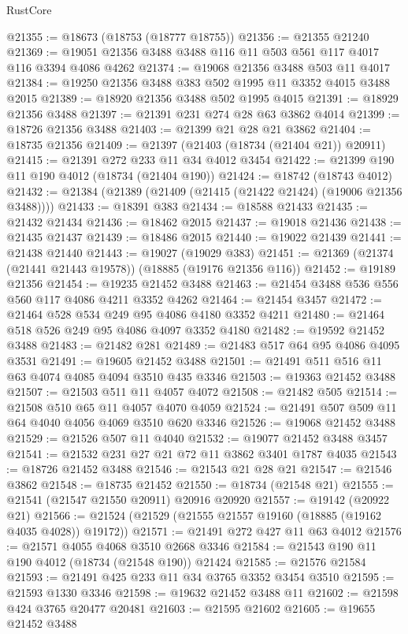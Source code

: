 \begin{lexlean}{RustCore}
\begin{coremodule}
@21355 := @18673 (@18753 (@18777 @18755))
@21356 := @21355 @21240
@21369 := @19051 @21356 @3488 @3488 @116 @11 @503 @561 @117 @4017 @116 @3394 @4086 @4262
@21374 := @19068 @21356 @3488 @503 @11 @4017
@21384 := @19250 @21356 @3488 @383 @502 @1995 @11 @3352 @4015 @3488 @2015
@21389 := @18920 @21356 @3488 @502 @1995 @4015
@21391 := @18929 @21356 @3488
@21397 := @21391 @231 @274 @28 @63 @3862 @4014
@21399 := @18726 @21356 @3488
@21403 := @21399 @21 @28 @21 @3862
@21404 := @18735 @21356
@21409 := @21397 (@21403 (@18734 (@21404 @21)) @20911)
@21415 := @21391 @272 @233 @11 @34 @4012 @3454
@21422 := @21399 @190 @11 @190 @4012 (@18734 (@21404 @190))
@21424 := @18742 (@18743 @4012)
@21432 := @21384 (@21389 (@21409 (@21415 (@21422 @21424) (@19006 @21356 @3488))))
@21433 := @18391 @383
@21434 := @18588 @21433
@21435 := @21432 @21434
@21436 := @18462 @2015
@21437 := @19018 @21436
@21438 := @21435 @21437
@21439 := @18486 @2015
@21440 := @19022 @21439
@21441 := @21438 @21440
@21443 := @19027 (@19029 @383)
@21451 := @21369 (@21374 (@21441 @21443 @19578)) (@18885 (@19176 @21356 @116))
@21452 := @19189 @21356
@21454 := @19235 @21452 @3488
@21463 := @21454 @3488 @536 @556 @560 @117 @4086 @4211 @3352 @4262
@21464 := @21454 @3457
@21472 := @21464 @528 @534 @249 @95 @4086 @4180 @3352 @4211
@21480 := @21464 @518 @526 @249 @95 @4086 @4097 @3352 @4180
@21482 := @19592 @21452 @3488
@21483 := @21482 @281
@21489 := @21483 @517 @64 @95 @4086 @4095 @3531
@21491 := @19605 @21452 @3488
@21501 := @21491 @511 @516 @11 @63 @4074 @4085 @4094 @3510 @435 @3346
@21503 := @19363 @21452 @3488
@21507 := @21503 @511 @11 @4057 @4072
@21508 := @21482 @505
@21514 := @21508 @510 @65 @11 @4057 @4070 @4059
@21524 := @21491 @507 @509 @11 @64 @4040 @4056 @4069 @3510 @620 @3346
@21526 := @19068 @21452 @3488
@21529 := @21526 @507 @11 @4040
@21532 := @19077 @21452 @3488 @3457
@21541 := @21532 @231 @27 @21 @72 @11 @3862 @3401 @1787 @4035
@21543 := @18726 @21452 @3488
@21546 := @21543 @21 @28 @21
@21547 := @21546 @3862
@21548 := @18735 @21452
@21550 := @18734 (@21548 @21)
@21555 := @21541 (@21547 @21550 @20911) @20916 @20920
@21557 := @19142 (@20922 @21)
@21566 := @21524 (@21529 (@21555 @21557 @19160 (@18885 (@19162 @4035 @4028)) @19172))
@21571 := @21491 @272 @427 @11 @63 @4012
@21576 := @21571 @4055 @4068 @3510 @2668 @3346
@21584 := @21543 @190 @11 @190 @4012 (@18734 (@21548 @190)) @21424
@21585 := @21576 @21584
@21593 := @21491 @425 @233 @11 @34 @3765 @3352 @3454 @3510
@21595 := @21593 @1330 @3346
@21598 := @19632 @21452 @3488 @11
@21602 := @21598 @424 @3765 @20477 @20481
@21603 := @21595 @21602
@21605 := @19655 @21452 @3488

\end{coremodule}
\end{lexlean}
